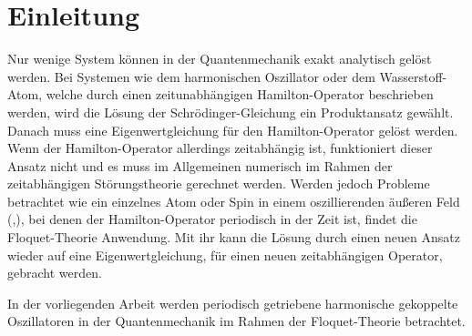\chapter{Einleitung}
\iffalse
Hier folgt eine kurze Einleitung in die Thematik der Bachelorarbeit.
Die Einleitung muss kurz sein, damit die vorgegebene Gesamtlänge der
Arbeit von 25 Seiten nicht überschritten wird.
Die Beschränkung der Seitenzahl sollte man ernst nehmen,
da Überschreitung zu Abzügen in der Note führen kann.
Um der Längenbeschränkung zu genügen, darf auch nicht an der Schriftgröße,
dem Zeilenabstand oder dem Satzspiegel (bedruckte Fläche der Seite) manipuliert werden.



nur wenige systeme exakt loesbar in qm harm oszi, wasserstoff. bei zeitabh hamiltonop keine stat schroed glgl  (eigenwertglg), gelingt aber bei periodischen mit floqet thoerie
\fi

Nur wenige System können in der Quantenmechanik exakt analytisch gelöst werden.
Bei Systemen wie dem harmonischen Oszillator oder dem Wasserstoff-Atom, welche durch einen zeitunabhängigen Hamilton-Operator beschrieben werden, wird die Lösung der Schrödinger-Gleichung ein Produktansatz gewählt.
Danach muss eine Eigenwertgleichung für den Hamilton-Operator gelöst werden.
Wenn der Hamilton-Operator allerdings zeitabhängig ist, funktioniert dieser Ansatz nicht und es muss im Allgemeinen numerisch im Rahmen der zeitabhängigen Störungstheorie gerechnet werden.
Werden jedoch Probleme betrachtet wie ein einzelnes Atom oder Spin in einem oszillierenden äußeren Feld (\cite{haengi},\cite{sherly}), bei denen der Hamilton-Operator periodisch in der Zeit ist, findet die Floquet-Theorie Anwendung.
Mit ihr kann die Lösung durch einen neuen Ansatz wieder auf eine Eigenwertgleichung, für einen neuen zeitabhängigen Operator, gebracht werden.

In der vorliegenden Arbeit werden periodisch getriebene harmonische gekoppelte Oszillatoren in der Quantenmechanik im Rahmen der Floquet-Theorie betrachtet. %

